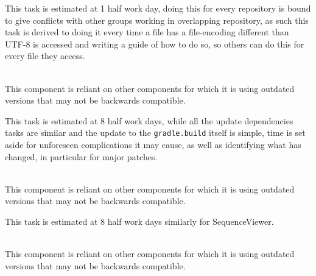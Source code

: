 \begin{description}[style=unboxed]
        This task is estimated at 1 half work day, doing this for every repository is bound to give conflicts with other groups working in overlapping repository, as such this task is derived to doing it every time a file has a file-encoding different than UTF-8 is accessed and writing a guide of how to do so, so others can do this for every file they access. 
    \item[SequenceViewer - Update dependencies] \hfill \\
        This component is reliant on other components for which it is using outdated versions that may not be backwards compatible.

        This task is estimated at 8 half work days, while all the update dependencies tasks are similar and the update to the \texttt{gradle.build} itself is simple, time is set aside for unforeseen complications it may cause, as well as identifying what has changed, in particular for major patches.
    \item[Sequence - Update dependencies] \hfill \\ 
        This component is reliant on other components for which it is using outdated versions that may not be backwards compatible.

        This task is estimated at 8 half work days similarly for SequenceViewer.
    \item[Picto Search - Update dependencies] \hfill \\
        This component is reliant on other components for which it is using outdated versions that may not be backwards compatible.


\end{description}
